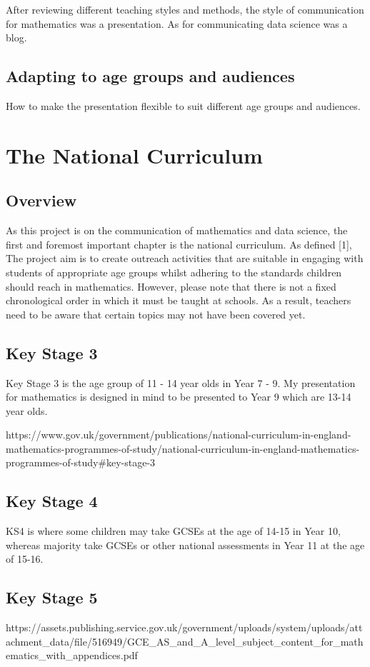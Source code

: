 \documentclass[12pt, a4paper,oneside]{book}
\numberwithin{equation}{section}
\begin{document}
After reviewing different teaching styles and methods, the style of communication for mathematics was a presentation. As for communicating data science was a blog.

\section{Adapting to age groups and audiences}

How to make the presentation flexible to suit different age groups and audiences.

\chapter{The National Curriculum}
\section{Overview}
As this project is on the communication of mathematics and data science, the first and foremost important chapter is the national curriculum. As defined [1], The project aim is to create outreach activities that are suitable in engaging with students of appropriate age groups whilst adhering to the standards children should reach in mathematics. However, please note that there is not a fixed chronological order in which it must be taught at schools. As a result, teachers need to be aware that certain topics may not have been covered yet.

\section{Key Stage 3}
Key Stage 3 is the age group of 11 - 14 year olds in Year 7 - 9. My presentation for mathematics is designed in mind to be presented to Year 9 which are 13-14 year olds.

https://www.gov.uk/government/publications/national-curriculum-in-england-mathematics-programmes-of-study/national-curriculum-in-england-mathematics-programmes-of-study#key-stage-3

\section{Key Stage 4}
KS4 is where some children may take GCSEs at the age of 14-15 in Year 10, whereas majority take GCSEs or other national assessments in Year 11 at the age of 15-16.

\section{Key Stage 5}
https://assets.publishing.service.gov.uk/government/uploads/system/uploads/attachment_data/file/516949/GCE_AS_and_A_level_subject_content_for_mathematics_with_appendices.pdf
\end{document}
